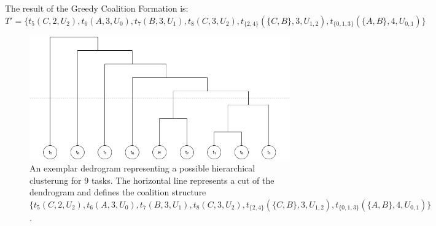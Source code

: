 The result of the Greedy Coalition Formation is:
\newline
$T'= \{ t_5(C,2,U_2), t_6(A,3,U_0),t_7(B,3,U_1),t_8 (C,3,U_2),t_{\{2,4\}}(\{C,B\},3,U_{1,2}), t_{\{0,1,3\}}(\{A,B\},4,U_{0,1}) \}$

\begin{figure} [hbt]
    \centering
    \includegraphics[width=\textwidth]{img/CF_graph.png}
    \caption{An exemplar dedrogram representing a possible hierarchical
    clusterung for 9 tasks. The horizontal line represents a cut of the dendrogram
    and defines the coalition structure
    $\{ t_5(C,2,U_2), t_6(A,3,U_0),t_7(B,3,U_1),t_8 (C,3,U_2),t_{\{2,4\}}(\{C,B\},3,U_{1,2}), t_{\{0,1,3\}}(\{A,B\},4,U_{0,1}) \}$.}
    \label{fig:CF_graph}
\end{figure}




